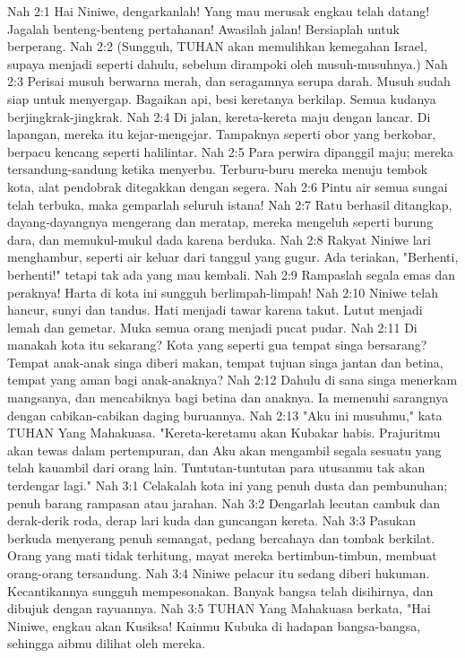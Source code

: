 Nah 2:1  Hai Niniwe, dengarkanlah! Yang mau merusak engkau telah datang! Jagalah benteng-benteng pertahanan! Awasilah jalan! Bersiaplah untuk berperang.
Nah 2:2  (Sungguh, TUHAN akan memulihkan kemegahan Israel, supaya menjadi seperti dahulu, sebelum dirampoki oleh musuh-musuhnya.)
Nah 2:3  Perisai musuh berwarna merah, dan seragamnya serupa darah. Musuh sudah siap untuk menyergap. Bagaikan api, besi keretanya berkilap. Semua kudanya berjingkrak-jingkrak.
Nah 2:4  Di jalan, kereta-kereta maju dengan lancar. Di lapangan, mereka itu kejar-mengejar. Tampaknya seperti obor yang berkobar, berpacu kencang seperti halilintar.
Nah 2:5  Para perwira dipanggil maju; mereka tersandung-sandung ketika menyerbu. Terburu-buru mereka menuju tembok kota, alat pendobrak ditegakkan dengan segera.
Nah 2:6  Pintu air semua sungai telah terbuka, maka gemparlah seluruh istana!
Nah 2:7  Ratu berhasil ditangkap, dayang-dayangnya mengerang dan meratap, mereka mengeluh seperti burung dara, dan memukul-mukul dada karena berduka.
Nah 2:8  Rakyat Niniwe lari menghambur, seperti air keluar dari tanggul yang gugur. Ada teriakan, "Berhenti, berhenti!" tetapi tak ada yang mau kembali.
Nah 2:9  Rampaslah segala emas dan peraknya! Harta di kota ini sungguh berlimpah-limpah!
Nah 2:10  Niniwe telah hancur, sunyi dan tandus. Hati menjadi tawar karena takut. Lutut menjadi lemah dan gemetar. Muka semua orang menjadi pucat pudar.
Nah 2:11  Di manakah kota itu sekarang? Kota yang seperti gua tempat singa bersarang? Tempat anak-anak singa diberi makan, tempat tujuan singa jantan dan betina, tempat yang aman bagi anak-anaknya?
Nah 2:12  Dahulu di sana singa menerkam mangsanya, dan mencabiknya bagi betina dan anaknya. Ia memenuhi sarangnya dengan cabikan-cabikan daging buruannya.
Nah 2:13  "Aku ini musuhmu," kata TUHAN Yang Mahakuasa. "Kereta-keretamu akan Kubakar habis. Prajuritmu akan tewas dalam pertempuran, dan Aku akan mengambil segala sesuatu yang telah kauambil dari orang lain. Tuntutan-tuntutan para utusanmu tak akan terdengar lagi."
Nah 3:1  Celakalah kota ini yang penuh dusta dan pembunuhan; penuh barang rampasan atau jarahan.
Nah 3:2  Dengarlah lecutan cambuk dan derak-derik roda, derap lari kuda dan guncangan kereta.
Nah 3:3  Pasukan berkuda menyerang penuh semangat, pedang bercahaya dan tombak berkilat. Orang yang mati tidak terhitung, mayat mereka bertimbun-timbun, membuat orang-orang tersandung.
Nah 3:4  Niniwe pelacur itu sedang diberi hukuman. Kecantikannya sungguh mempesonakan. Banyak bangsa telah disihirnya, dan dibujuk dengan rayuannya.
Nah 3:5  TUHAN Yang Mahakuasa berkata, "Hai Niniwe, engkau akan Kusiksa! Kainmu Kubuka di hadapan bangsa-bangsa, sehingga aibmu dilihat oleh mereka.

